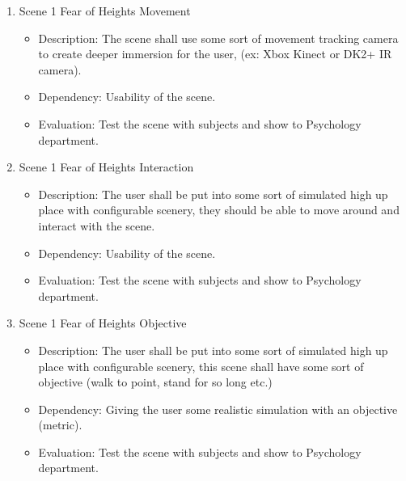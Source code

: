 \documentclass[a4paper,10pt]{article}
\begin{document}
\begin{enumerate}
		\item Scene 1 Fear of Heights Movement 
		\begin{itemize}
		\item Description: The scene shall use some sort of movement tracking camera to create deeper immersion for the user, (ex: Xbox Kinect or DK2+ IR camera).
		\item Dependency: Usability of the scene.
		\item Evaluation: Test the scene with subjects and show to Psychology department. 
		\end{itemize}
		
		\item Scene 1 Fear of Heights Interaction 
		\begin{itemize}
		\item Description: The user shall be put into some sort of simulated high up place with configurable scenery, they should be able to move around and interact with the scene.
		\item Dependency: Usability of the scene.
		\item Evaluation: Test the scene with subjects and show to Psychology department. 
		\end{itemize}
		
		
		\item Scene 1 Fear of Heights Objective 
		\begin{itemize}
		\item Description: The user shall be put into some sort of simulated high up place with configurable scenery, this scene shall have some sort of objective (walk to point, stand for so long etc.)
		\item Dependency: Giving the user some realistic simulation with an objective (metric).
		\item Evaluation: Test the scene with subjects and show to Psychology department. 
		\end{itemize}
		

\end{enumerate}
\end{document}
